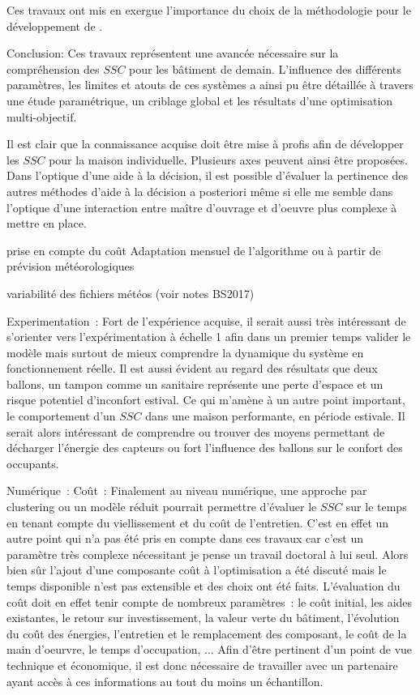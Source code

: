 



Ces travaux ont mis en exergue l’importance du choix de la méthodologie pour le
développement de .



Conclusion:
Ces travaux représentent une avancée nécessaire sur la compréhension des $SSC$ pour
les bâtiment de demain. L’influence des différents paramètres, les limites et atouts
de ces systèmes a ainsi pu être détaillée à travers une étude paramétrique, un criblage
global et les résultats d’une optimisation multi-objectif.

Il est clair que la connaissance acquise doit être mise à profis afin de développer
les $SSC$ pour la maison individuelle. Plusieurs axes peuvent ainsi être proposées.
Dans l’optique d’une aide à la décision, il est possible d’évaluer la pertinence
des autres méthodes d’aide à la décision a posteriori même si elle me semble dans
l’optique d’une interaction entre maître d’ouvrage et d’oeuvre plus complexe à mettre
en place.

prise en compte du coût
Adaptation mensuel de l’algorithme ou à partir de prévision météorologiques

variabilité des fichiers météos (voir notes BS2017)

Experimentation~:
Fort de l’expérience acquise, il serait aussi très intéressant de s’orienter vers
l’expérimentation à échelle 1 afin dans un premier temps valider le modèle mais surtout
de mieux comprendre la dynamique du système en fonctionnement réelle.
Il est aussi évident au regard des résultats que deux ballons, un tampon comme un sanitaire
représente une perte d’espace et un risque potentiel d’inconfort estival. Ce qui m’amène à
un autre point important, le comportement d’un $SSC$ dans une maison performante, en période
estivale. Il serait alors intéressant de comprendre ou trouver des moyens permettant de
décharger l’énergie des capteurs ou fort l’influence des ballons sur le confort des occupants.


Numérique~:
Coût~:
Finalement au niveau numérique, une approche par clustering ou un modèle réduit pourrait
permettre d’évaluer le $SSC$ sur le temps en tenant compte du viellissement et du coût
de l’entretien. C’est en effet un autre point qui n’a pas été pris en compte dans ces travaux
car c’est un paramètre très complexe nécessitant je pense un travail doctoral à lui seul.
Alors bien sûr l’ajout d’une composante coût à l’optimisation a été discuté mais le
temps disponible n’est pas extensible et des choix ont été faits.
L’évaluation du coût doit en effet tenir compte de nombreux paramètres~: le coût initial,
les aides existantes, le retour sur investissement, la valeur verte du bâtiment, l’évolution
du coût des énergies, l’entretien et le remplacement des composant, le coût de la main d’oeurvre,
le temps d’occupation, ...
Afin d’être pertinent d’un point de vue technique et économique, il est donc nécessaire
de travailler avec un partenaire ayant accès à ces informations au tout du moins un
échantillon.

